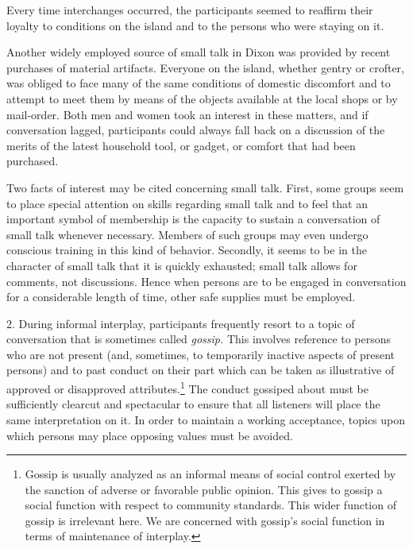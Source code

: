 \documentclass[openany,nobib]{tufte-book}
\begin{document}
Every time interchanges occurred, the participants seemed to reaffirm
their loyalty to conditions on the island and to the persons who were
staying on it.

Another widely employed source of small talk in Dixon was provided by
recent purchases of material artifacts. Everyone on the island, whether
gentry or crofter, was obliged to face many of the same conditions of
domestic discomfort and to attempt to meet them by means of the objects
available at the local shops or by mail-order. Both men and women took
an interest in these matters, and if conversation lagged, participants
could always fall back on a discussion of the merits of the latest
household tool, or gadget, or comfort that had been purchased.

Two facts of interest may be cited concerning small talk. First, some
groups seem to place special attention on skills regarding small talk
and to feel that an important symbol of membership is the capacity to
sustain a conversation of small talk whenever necessary. Members of such
groups may even undergo conscious training in this kind of behavior.
Secondly, it seems to be in the character of small talk that it is
quickly exhausted; small talk allows for comments, not discussions.
Hence when persons are to be engaged in conversation for a considerable
length of time, other safe supplies must be employed.

2. During informal interplay, participants frequently resort to a topic
of conversation that is sometimes called \emph{gossip.} This involves
reference to persons who are not present (and, sometimes, to temporarily
inactive aspects of present persons) and to past conduct on their part
which can be taken as illustrative of approved or disapproved
attributes.\footnote{Gossip is usually analyzed as an informal means of
  social control exerted by the sanction of adverse or favorable public
  opinion. This gives to gossip a social function with respect to
  community standards. This wider function of gossip is irrelevant here.
  We are concerned with gossip's social function in terms of maintenance
  of interplay.} The conduct gossiped about must be sufficiently
clearcut and spectacular to ensure that all listeners will place the
same interpretation on it. In order to maintain a working acceptance,
topics upon which persons may place opposing values must be avoided.
\end{document}
